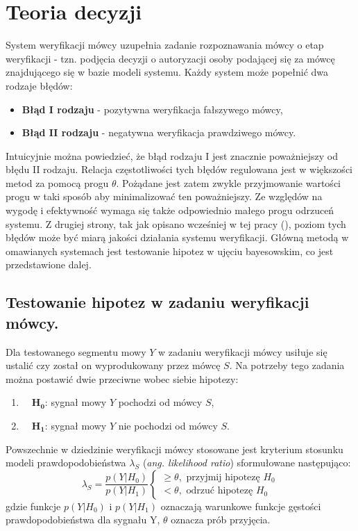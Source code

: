 \section{Teoria decyzji}
\label{verif}

System weryfikacji mówcy uzupełnia zadanie rozpoznawania mówcy o etap weryfikacji - tzn. podjęcia decyzji o autoryzacji osoby podającej się za mówcę znajdującego się w bazie modeli systemu. Każdy system może popełnić dwa rodzaje błędów:
\begin{itemize}
  \item{\textbf{Błąd I rodzaju}} - pozytywna weryfikacja fałszywego mówcy,
  \item{\textbf{Błąd II rodzaju}} - negatywna weryfikacja prawdziwego mówcy.
\end{itemize}
Intuicyjnie można powiedzieć, że błąd rodzaju I jest znacznie poważniejszy od błędu II rodzaju. Relacja częstotliwości tych błędów regulowana jest w większości metod za pomocą progu $\theta$. Pożądane jest zatem zwykle przyjmowanie wartości progu w taki sposób aby minimalizować ten poważniejszy. Ze względów na wygodę i efektywność wymaga się także odpowiednio małego progu odrzuceń systemu. Z drugiej strony, tak jak opisano wcześniej w tej pracy (\cite{err}), poziom tych błędów może być miarą jakości działania systemu weryfikacji. Główną metodą w omawianych systemach jest testowanie hipotez w ujęciu bayesowskim, co jest przedstawione dalej.  

\subsection{Testowanie hipotez w zadaniu weryfikacji mówcy.}

Dla testowanego segmentu mowy $Y$ w zadaniu weryfikacji mówcy usiłuje się ustalić czy został on wyprodukowany przez mówcę $S$. Na potrzeby tego zadania można postawić dwie przeciwne wobec siebie hipotezy:
\begin{enumerate}
  \item{$\quad\bm{H_0}$}: sygnał mowy $Y$ pochodzi od mówcy $S$,
  \item{$\quad\bm{H_1}$}: sygnał mowy $Y$ nie pochodzi od mówcy $S$.
\end{enumerate}
Powszechnie w dziedzinie weryfikacji mówcy stosowane jest kryterium stosunku modeli prawdopodobieństwa $\lambda_S$ (\textit{ang. likelihood ratio}) sformułowane następująco:
\begin{equation}
  \label{likratio}
  \lambda_S = \frac{p(Y|H_0)}{p(Y|H_1)}
  \begin{cases}
    \ge \theta, \textrm{ przyjmij hipotezę } H_0 \\
    < \theta, \textrm{ odrzuć hipotezę } H_0
  \end{cases}
\end{equation}
gdzie funkcje $p(Y|H_0)$ i $p(Y|H_1)$ oznaczają warunkowe funkcje gęstości prawdopodobieństwa dla sygnału Y, $\theta$ oznacza prób przyjęcia. 

